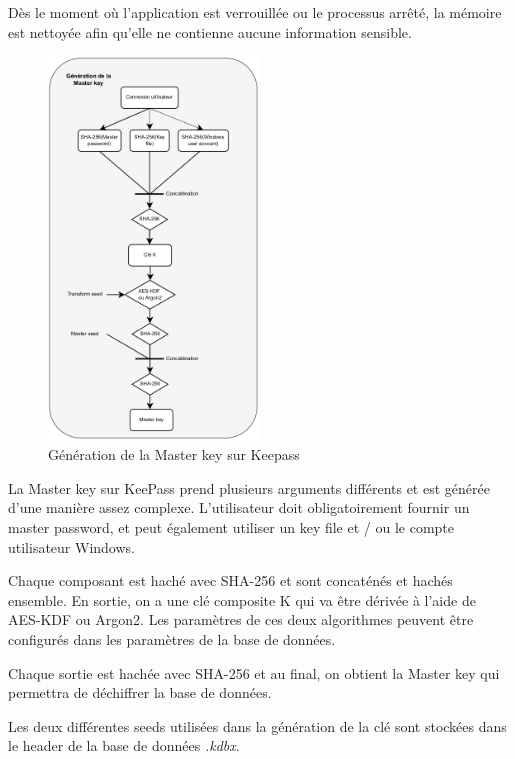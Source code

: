 Dès le moment où l'application est verrouillée ou le processus arrêté, la mémoire est nettoyée afin qu'elle ne contienne aucune information sensible.

 \newpage

\begin{figure} 
	\includegraphics[width=0.5\textwidth]{images/keepass_generation_key.png}
	\caption{Génération de la Master key sur Keepass \label{schema_keepass}}
\end{figure}

La Master key sur KeePass prend plusieurs arguments différents et est générée d'une manière assez complexe. L'utilisateur doit obligatoirement fournir un master password, et peut également utiliser un key file et / ou le compte utilisateur Windows. 

Chaque composant est haché avec SHA-256 et sont concaténés et hachés ensemble. En sortie, on a une clé composite K qui va être dérivée à l'aide de AES-KDF ou Argon2. Les paramètres de ces deux algorithmes peuvent être configurés dans les paramètres de la base de données.

Chaque sortie est hachée avec SHA-256 et au final, on obtient la Master key qui permettra de déchiffrer la base de données.

Les deux différentes seeds utilisées dans la génération de la clé sont stockées dans le header de la base de données \textit{.kdbx}.


